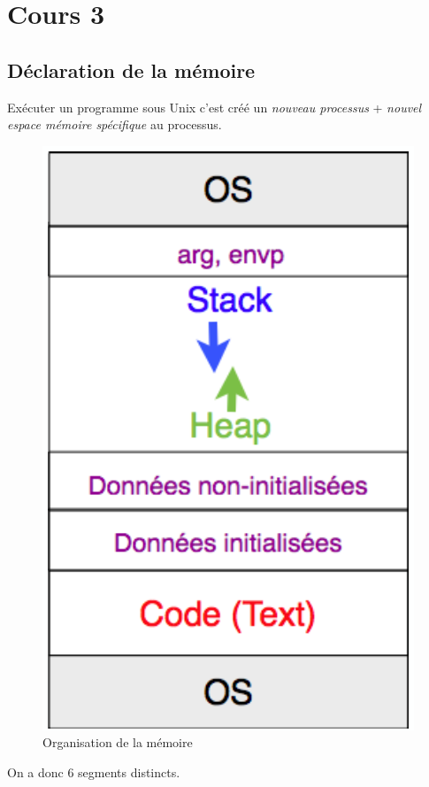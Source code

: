 \section{Cours 3}\label{cours-3}

\subsection{Déclaration de la
mémoire}\label{duxe9claration-de-la-muxe9moire}

Exécuter un programme sous Unix c'est créé un \emph{nouveau processus} +
\emph{nouvel espace mémoire spécifique} au processus.

\begin{figure}
\centering
\includegraphics{image-47.png}
\caption{Organisation de la mémoire}
\end{figure}

On a donc 6 segments distincts.

